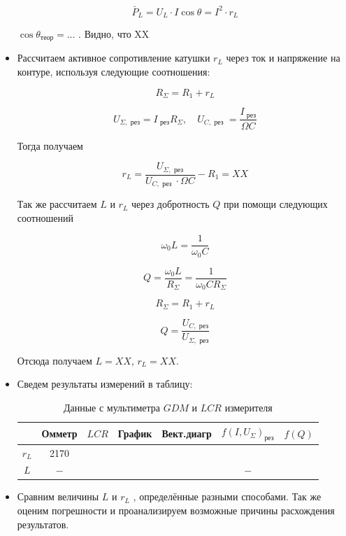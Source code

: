 \documentclass[a4paper, 12pt]{article}%
\begin{document}
\begin{itemize}
\begin{equation}
\bar{P}_{L}=U_{L} \cdot I \cos{\theta} =I^{2} \cdot r_{L}
\end{equation}

$\cos{\theta}_{\text{теор}} = \dots $ . Видно, что XX


\item  Рассчитаем активное сопротивление катушки $r_L$ через ток и напряжение
на контуре, используя следующие соотношения:

\[  R_{\Sigma}=R_1 + r_{L} \]

\[  U_{\Sigma, \text{ рез}}=I_{\text{ рез}} R_{\Sigma}, \quad U_{C, \text { рез }}=\frac{I_{\text{ рез}}}{\Omega C} \]

Тогда получаем	

\[r_L = \frac{U_{\Sigma, \text{ рез}}}{U_{C, \text { рез }} \cdot \Omega C} - R_1 = XX\]

Так же рассчитаем $L$ и $r_L$ через добротность $Q$ при помощи следующих соотношений 

\[ \omega_{0} L=\frac{1}{\omega_{0} C} \]

\[ Q=\frac{\omega_{0} L}{R_{\Sigma}}=\frac{1}{\omega_{0} C R_{\Sigma}} \]

\[ R_{\Sigma}=R_1 + r_{L} \]

\[ Q=\frac{U_{C, \text{ рез}}}{U_{\Sigma, \text{ рез}}}\]

Отсюда получаем $L = XX$, $r_L = XX$.

\item Сведем результаты измерений в таблицу:

\begin{table}[!h]
\begin{center}
\begin{tabular}{|c|c|c|c|c|c|c|}
\hline & Омметр & $LCR$ & График & Вект.диагр & $f\left(I, U_{\Sigma}\right)_{\text{рез}}$ & $f(Q)$ \\
\hline \hline$r_{L}$ & 2170 & & & & & \\
$L$ & $-$ & & & & $-$ & \\
\hline
\end{tabular}
\caption{Данные с мультиметра $GDM$ и $LCR$ измерителя}
\end{center} 
\end{table}

\item Сравним величины $L$ и $r_L$ , определённые разными способами. Так же оценим
погрешности и проанализируем возможные причины расхождения результатов.




\end{itemize}
\end{document}
